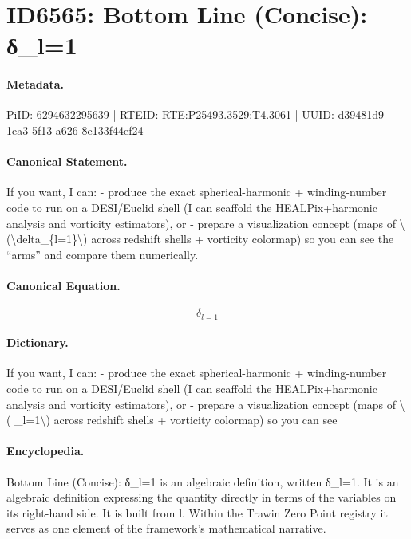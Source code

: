 \section*{ID6565: Bottom Line (Concise): δ\_l=1}
\paragraph{Metadata.}
PiID: 6294632295639 | RTEID: RTE:P25493.3529:T4.3061 | UUID: d39481d9-1ea3-5f13-a626-8e133f44ef24

\paragraph{Canonical Statement.}
If you want, I can: - produce the exact spherical-harmonic + winding-number code to run on a DESI/Euclid shell (I can scaffold the HEALPix+harmonic analysis and vorticity estimators), or - prepare a visualization concept (maps of \textbackslash{}(\textbackslash{}delta\_\{l=1\}\textbackslash{}) across redshift shells + vorticity colormap) so you can see the “arms” and compare them numerically.

\paragraph{Canonical Equation.}
\[
\delta_{l=1}
\]

\paragraph{Dictionary.}
If you want, I can: - produce the exact spherical-harmonic + winding-number code to run on a DESI/Euclid shell (I can scaffold the HEALPix+harmonic analysis and vorticity estimators), or - prepare a visualization concept (maps of \textbackslash{}( \_l=1\textbackslash{}) across redshift shells + vorticity colormap) so you can see

\paragraph{Encyclopedia.}
Bottom Line (Concise): δ\_l=1 is an algebraic definition, written δ\_l=1. It is an algebraic definition expressing the quantity directly in terms of the variables on its right-hand side. It is built from l. Within the Trawin Zero Point registry it serves as one element of the framework's mathematical narrative.

